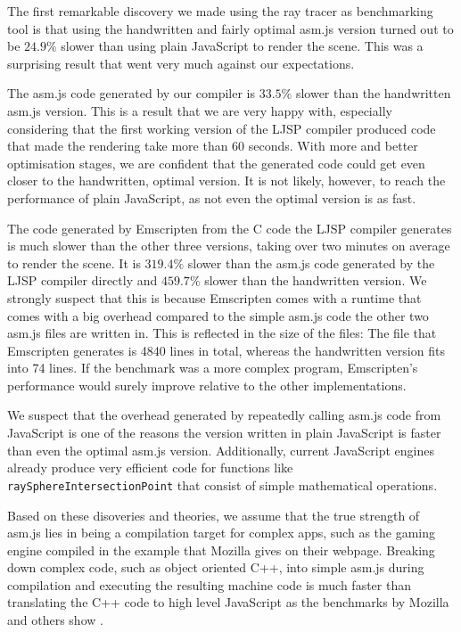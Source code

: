 \documentclass[11pt]{report}
\begin{document}
The first remarkable discovery we made using the ray tracer as benchmarking tool is that using the handwritten and fairly optimal asm.js version turned out to be $24.9\%$ slower than using plain JavaScript to render the scene. This was a surprising result that went very much against our expectations.

The asm.js code generated by our compiler is $33.5\%$ slower than the handwritten asm.js version. This is a result that we are very happy with, especially considering that the first working version of the LJSP compiler produced code that made the rendering take more than 60 seconds. With more and better optimisation stages, we are confident that the generated code could get even closer to the handwritten, optimal version. It is not likely, however, to reach the performance of plain JavaScript, as not even the optimal version is as fast.

The code generated by Emscripten from the C code the LJSP compiler generates is much slower than the other three versions, taking over two minutes on average to render the scene. It is $319.4\%$ slower than the asm.js code generated by the LJSP compiler directly and $459.7\%$ slower than the handwritten version. We strongly suspect that this is because Emscripten comes with a runtime that comes with a big overhead compared to the simple asm.js code the other two asm.js files are written in. This is reflected in the size of the files: The file that Emscripten generates is 4840 lines in total, whereas the handwritten version fits into 74 lines. If the benchmark was a more complex program, Emscripten's performance would surely improve relative to the other implementations.

We suspect that the overhead generated by repeatedly calling asm.js code from JavaScript is one of the reasons the version written in plain JavaScript is faster than even the optimal asm.js version. Additionally, current JavaScript engines already produce very efficient code for functions like \texttt{raySphereIntersectionPoint} that consist of simple mathematical operations.

Based on these disoveries and theories, we assume that the true strength of asm.js lies in being a compilation target for complex apps, such as the gaming engine compiled in the example that Mozilla gives on their webpage. Breaking down complex code, such as object oriented C++, into simple asm.js during compilation and executing the resulting machine code is much faster than translating the C++ code to high level JavaScript as the benchmarks by Mozilla and others show \cite{asmjsbenchmarks}.
\end{document}
